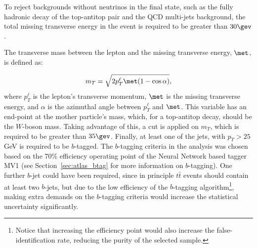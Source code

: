 To reject backgrounds without neutrinos in the final state, such as the fully hadronic decay of the top-antitop
pair and the QCD multi-jets background, the total missing transverse energy in the event is required to be greater than $30\gev$.

The transverse mass between the lepton and the missing transverse energy, $\met$, is defined as:

\begin{equation}
\displaystyle
m_T = \sqrt{2 p_T^\ell \met (1-\cos \alpha)},
\label{eq:ttjets_mtw}
\end{equation}
where $p_T^\ell$ is the lepton's transverse momentum, $\met$ is the missing transverse energy, and $\alpha$ is the
azimuthal angle between $p_T^\ell$ and $\met$. This variable has an end-point at the mother particle's mass, which, for a top-antitop decay,
should be the $W$-boson mass.
Taking advantage of this, a cut is applied on $m_T$, which is required to be greater than $35\gev$.
Finally, at least one of the jets, with $p_T > 25$ GeV is required to be $b$-tagged. The $b$-tagging criteria in the analysis was chosen based on
the 70\% efficiency operating point of the Neural Network based tagger MV1 (see Section~\ref{sec:atlas_btag} for more information on $b$-tagging).
One further $b$-jet could have been required,
since in principle $t\bar{t}$ events should contain at least two $b$-jets, but due to the low
efficiency of the $b$-tagging algorithm\footnote{Notice that increasing the efficiency point would also increase the false-identification rate, reducing
the purity of the selected sample.}, making extra demands on the $b$-tagging criteria would increase the statistical uncertainty significantly.


